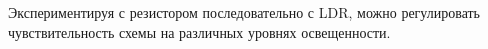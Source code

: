 
Экспериментируя с резистором последовательно с LDR, можно регулировать
чувствительность схемы на различных уровнях освещенности.
